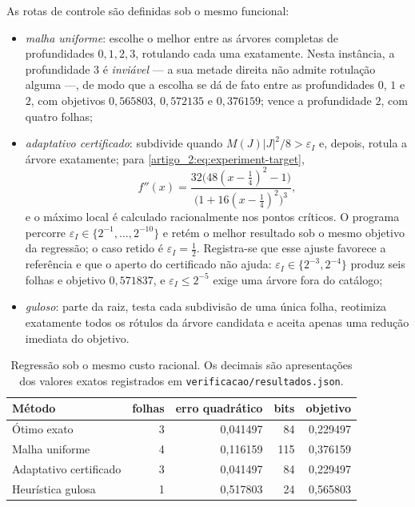 As rotas de controle são definidas sob o mesmo funcional:
\begin{itemize}[leftmargin=1.7em]
 \item \emph{malha uniforme}: escolhe o melhor entre as árvores completas de
 profundidades $0,1,2,3$, rotulando cada uma exatamente. Nesta instância, a
 profundidade $3$ é \emph{inviável} --- a sua metade direita não admite
 rotulação alguma ---, de modo que a escolha se dá de fato entre as
 profundidades $0$, $1$ e $2$, com objetivos $0{,}565803$, $0{,}572135$ e
 $0{,}376159$; vence a profundidade $2$, com quatro folhas;
 \item \emph{adaptativo certificado}: subdivide quando
 $M(J)|J|^2/8>\varepsilon_I$ e, depois, rotula a árvore exatamente; para
 \eqref{artigo_2:eq:experiment-target},
 \[
 f''(x)=
 \frac{32\bigl(48(x-\tfrac14)^2-1\bigr)}
      {\bigl(1+16(x-\tfrac14)^2\bigr)^3},
 \]
 e o máximo local é calculado racionalmente nos pontos críticos. O programa
 percorre $\varepsilon_I\in\{2^{-1},\dots,2^{-10}\}$ e retém o melhor
 resultado sob o mesmo objetivo da regressão; o caso retido é
 $\varepsilon_I=\tfrac12$. Registra-se que esse ajuste favorece a referência
 e que o aperto do certificado não ajuda: $\varepsilon_I\in\{2^{-3},2^{-4}\}$
 produz seis folhas e objetivo $0{,}571837$, e $\varepsilon_I\le2^{-5}$ exige
 uma árvore fora do catálogo;
 \item \emph{guloso}: parte da raiz, testa cada subdivisão de uma única folha,
 reotimiza exatamente todos os rótulos da árvore candidata e aceita apenas
 uma redução imediata do objetivo.
\end{itemize}

\begin{table}[t]
 \centering
 \caption{Regressão sob o mesmo custo racional. Os decimais são
 apresentações dos valores exatos registrados em
 \texttt{verificacao/resultados.json}.}
 \label{artigo_2:tab:selector-comparison}
 \small
 \begin{tabular}{lrrrr}
\toprule
Método & folhas & erro quadrático & bits & objetivo \\
\midrule
Ótimo exato & 3 & 0{,}041497 & 84 & 0{,}229497 \\
Malha uniforme & 4 & 0{,}116159 & 115 & 0{,}376159 \\
Adaptativo certificado & 3 & 0{,}041497 & 84 & 0{,}229497 \\
Heurística gulosa & 1 & 0{,}517803 & 24 & 0{,}565803 \\
\bottomrule
\end{tabular}

\end{table}

